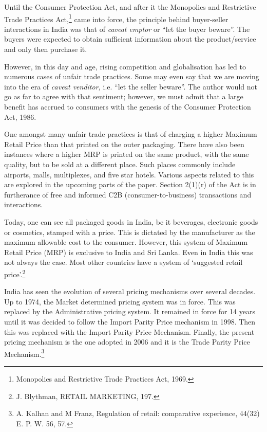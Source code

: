\begin{multicols}{2}
\noi
Until the Consumer Protection Act, and after it the Monopolies and Restrictive Trade Practices Act,\footnote{Monopolies and Restrictive Trade Practices Act, 1969.} came into force, the principle behind buyer-seller interactions in India was that of \textit{caveat emptor} or “let the buyer beware”. The buyers were expected to obtain sufficient information about the product/service and only then purchase it.

\noi
However, in this day and age, rising competition and globalisation has led to numerous cases
of unfair trade practices. Some may even say that we are moving into the era of \textit{caveat venditor,}
i.e. “let the seller beware”. The author would not go as far to agree with that sentiment;
however, we must admit that a large benefit has accrued to consumers with the genesis of the
Consumer Protection Act, 1986.

\noi
One amongst many unfair trade practices is that of charging a higher Maximum Retail Price
than that printed on the outer packaging. There have also been instances where a higher MRP
is printed on the same product, with the same quality, but to be sold at a different place. Such
places commonly include airports, malls, multiplexes, and five star hotels. Various aspects related to this are explored in the upcoming parts of the paper. Section 2(1)(r) of the Act is in
furtherance of free and informed C2B (consumer-to-business) transactions and interactions.

\vspace{-.1cm}


\vspace{-.1cm}

\noi
Today, one can see all packaged goods in India, be it beverages, electronic goods or cosmetics,
stamped with a price. This is dictated by the manufacturer as the maximum allowable cost to
the consumer. However, this system of Maximum Retail Price (MRP) is exclusive to India and
Sri Lanka. Even in India this was not always the case. Most other countries have a system of
‘suggested retail price’.\footnote{J. Blythman, RETAIL MARKETING, 197.}

\vspace{-.1cm}

\noi
India has seen the evolution of several pricing mechanisms over several decades. Up to 1974,
the Market determined pricing system was in force. This was replaced by the Administrative
pricing system. It remained in force for 14 years until it was decided to follow the Import Parity
Price mechanism in 1998. Then this was replaced with the Import Parity Price Mechanism.
Finally, the present pricing mechanism is the one adopted in 2006 and it is the Trade Parity
Price Mechanism.\footnote{A. Kalhan and M Franz, Regulation of retail: comparative experience, 44(32) E. P. W. 56, 57.}


\end{multicols}
